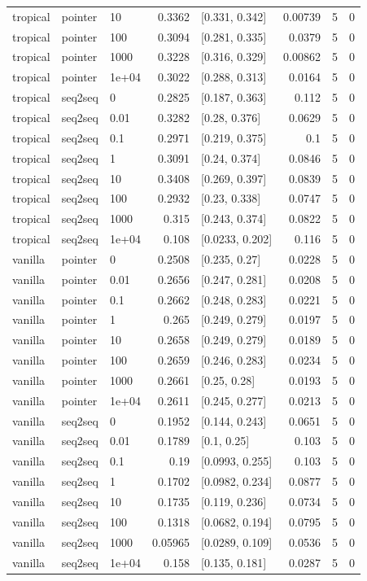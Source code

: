 \documentclass[10pt]{article}
\begin{document}
{\begin{longtable}{lllrlrrr}
tropical & pointer & 10 & 0.3362 & [0.331, 0.342] & 0.00739 & 5 & 0\\
tropical & pointer & 100 & 0.3094 & [0.281, 0.335] & 0.0379 & 5 & 0\\
tropical & pointer & 1000 & 0.3228 & [0.316, 0.329] & 0.00862 & 5 & 0\\
tropical & pointer & 1e+04 & 0.3022 & [0.288, 0.313] & 0.0164 & 5 & 0\\
tropical & seq2seq & 0 & 0.2825 & [0.187, 0.363] & 0.112 & 5 & 0\\
tropical & seq2seq & 0.01 & 0.3282 & [0.28, 0.376] & 0.0629 & 5 & 0\\
tropical & seq2seq & 0.1 & 0.2971 & [0.219, 0.375] & 0.1 & 5 & 0\\
tropical & seq2seq & 1 & 0.3091 & [0.24, 0.374] & 0.0846 & 5 & 0\\
tropical & seq2seq & 10 & 0.3408 & [0.269, 0.397] & 0.0839 & 5 & 0\\
tropical & seq2seq & 100 & 0.2932 & [0.23, 0.338] & 0.0747 & 5 & 0\\
tropical & seq2seq & 1000 & 0.315 & [0.243, 0.374] & 0.0822 & 5 & 0\\
tropical & seq2seq & 1e+04 & 0.108 & [0.0233, 0.202] & 0.116 & 5 & 0\\
vanilla & pointer & 0 & 0.2508 & [0.235, 0.27] & 0.0228 & 5 & 0\\
vanilla & pointer & 0.01 & 0.2656 & [0.247, 0.281] & 0.0208 & 5 & 0\\
vanilla & pointer & 0.1 & 0.2662 & [0.248, 0.283] & 0.0221 & 5 & 0\\
vanilla & pointer & 1 & 0.265 & [0.249, 0.279] & 0.0197 & 5 & 0\\
vanilla & pointer & 10 & 0.2658 & [0.249, 0.279] & 0.0189 & 5 & 0\\
vanilla & pointer & 100 & 0.2659 & [0.246, 0.283] & 0.0234 & 5 & 0\\
vanilla & pointer & 1000 & 0.2661 & [0.25, 0.28] & 0.0193 & 5 & 0\\
vanilla & pointer & 1e+04 & 0.2611 & [0.245, 0.277] & 0.0213 & 5 & 0\\
vanilla & seq2seq & 0 & 0.1952 & [0.144, 0.243] & 0.0651 & 5 & 0\\
vanilla & seq2seq & 0.01 & 0.1789 & [0.1, 0.25] & 0.103 & 5 & 0\\
vanilla & seq2seq & 0.1 & 0.19 & [0.0993, 0.255] & 0.103 & 5 & 0\\
vanilla & seq2seq & 1 & 0.1702 & [0.0982, 0.234] & 0.0877 & 5 & 0\\
vanilla & seq2seq & 10 & 0.1735 & [0.119, 0.236] & 0.0734 & 5 & 0\\
vanilla & seq2seq & 100 & 0.1318 & [0.0682, 0.194] & 0.0795 & 5 & 0\\
vanilla & seq2seq & 1000 & 0.05965 & [0.0289, 0.109] & 0.0536 & 5 & 0\\
vanilla & seq2seq & 1e+04 & 0.158 & [0.135, 0.181] & 0.0287 & 5 & 0\\
\bottomrule
\end{longtable}
}
\end{document}
